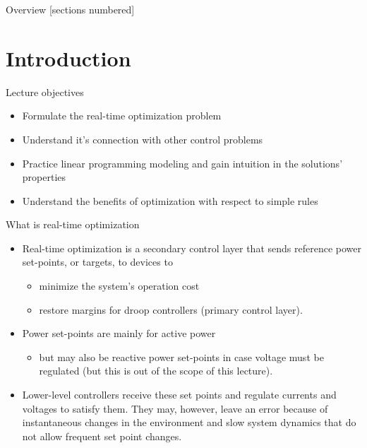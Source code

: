 \titleframe

\begin{frame}{Overview}
  [sections numbered]
  \tableofcontents[hideallsubsections]
\end{frame}

\section{Introduction}

\begin{frame} {Lecture objectives}
    \begin{itemize}
        \item Formulate the real-time optimization problem
        \item Understand it's connection with other control problems
        \item Practice linear programming modeling and gain intuition in the solutions' properties
        \item Understand the benefits of optimization with respect to simple rules
    \end{itemize}
\end{frame}

\begin{frame} {What is real-time optimization}
\begin{itemize}
\item Real-time optimization is a secondary control layer that sends reference power set-points, or targets, to devices to 
\begin{itemize}
    \item minimize the system's operation cost
    \item restore margins for droop controllers (primary control layer). 
\end{itemize}  
\item Power set-points are mainly for active power  
\begin{itemize}
    \item but may also be reactive power set-points in case voltage must be regulated (but this is out of the scope of this lecture).
\end{itemize}
\item Lower-level controllers receive these set points and regulate currents and voltages to satisfy them. They may, however, leave an error because of instantaneous changes in the environment and slow system dynamics that do not allow frequent set point changes.
\end{itemize}
\end{frame}

